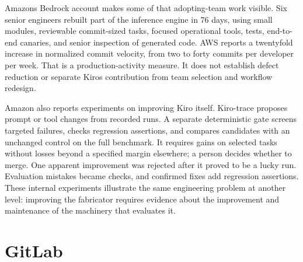 
Amazon\textquotesingle s Bedrock account makes some of that adopting-team work visible. Six senior engineers rebuilt part of the inference engine in 76 days, using small modules, reviewable commit-sized tasks, focused operational tools, tests, end-to-end canaries, and senior inspection of generated code\citep{kiro2026bedrock}. AWS reports a twentyfold increase in normalized commit velocity, from two to forty commits per developer per week\citep{sivasubramanian2026frontier}. That is a production-activity measure. It does not establish defect reduction or separate Kiro\textquotesingle s contribution from team selection and workflow redesign.


Amazon also reports experiments on improving Kiro itself. Kiro-trace proposes prompt or tool changes from recorded runs. A separate deterministic gate screens targeted failures, checks regression assertions, and compares candidates with an unchanged control on the full benchmark. It requires gains on selected tasks without losses beyond a specified margin elsewhere; a person decides whether to merge. One apparent improvement was rejected after it proved to be a lucky run. Evaluation mistakes became checks, and confirmed fixes add regression assertions\citep{kim2026kirotrace}. These internal experiments illustrate the same engineering problem at another level: improving the fabricator requires evidence about the improvement and maintenance of the machinery that evaluates it.

\section{GitLab}\label{heading:gitlab}


